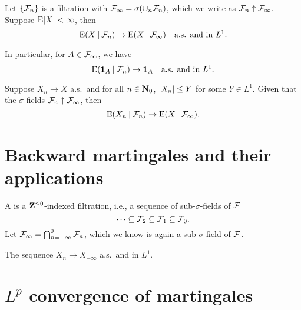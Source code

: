 \begin{namedthm}
    Let $\{\mathcal{F}_n\}$ is a filtration with $\mathcal{F}_\infty = \sigma(\cup_n \mathcal{F}_n)$, which we write as $\mathcal{F}_n \uparrow \mathcal{F}_\infty$. Suppose $\mathop{}\!\mathrm{E} \lvert X \rvert<\infty$, then \[
        \mathop{}\!\mathrm{E}(X \mathbin{|} \mathcal{F}_n) \to \mathop{}\!\mathrm{E}(X\mathbin{|} \mathcal{F}_\infty) \quad \text{a.s. and in }L^1.
    \]

    In particular, for $A \in \mathcal{F}_\infty$, we have \[
        \mathop{}\!\mathrm{E}(\mathbf{1}_A \mathbin{|} \mathcal{F}_n) \to \mathbf{1}_A \quad \text{a.s. and in }L^1.
    \]
\end{namedthm}

\begin{namedthm}
    Suppose $X_n \to X$ a.s.\ and for all $n \in \mathbf{N}_0$, $\lvert X_n \rvert \leq Y$ for some $Y \in L^1$. Given that the $\sigma$-fields $\mathcal{F}_n \uparrow \mathcal{F}_\infty$, then \[
        \mathop{}\!\mathrm{E}(X_n \mathbin{|} \mathcal{F}_n) \to \mathop{}\!\mathrm{E}(X \mathbin{|} \mathcal{F}_\infty).
    \]

    
\end{namedthm}

\section{Backward martingales and their applications}
\begin{defn}
    A  is a $\mathbf{Z}^{\leq 0}$-indexed filtration, i.e., a sequence of sub-$\sigma$-fields of $\mathcal{F}$ \[
        \dotsb\subseteq \mathcal{F}_2 \subseteq \mathcal{F}_1 \subseteq \mathcal{F}_0.
    \] Let $\mathcal{F}_\infty = \bigcap_{n=-\infty}^0 \mathcal{F}_n$, which we know is again a sub-$\sigma$-field of $\mathcal{F}$.
\end{defn}

\begin{namedthm}
    The sequence $X_n \to X_{-\infty}$ a.s.\ and in $L^1$.
\end{namedthm}

\begin{exa}
    
\end{exa}

\begin{exa}
    
\end{exa}

\section{\texorpdfstring{$L^p$}{Lp} convergence of martingales}

